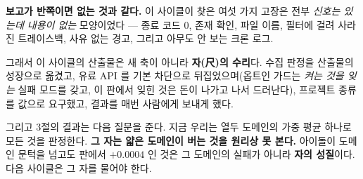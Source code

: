 \documentclass[10pt]{article}
\begin{document}
\textbf{보고가 반쪽이면 없는 것과 같다.} 이 사이클이 찾은 여섯 가지
고장은 전부 \emph{신호는 있는데 내용이 없는} 모양이었다 --- 종료 코드
0, 존재 확인, 파일 이름, 필터에 걸려 사라진 트레이스백, 사유 없는
경고, 그리고 아무도 안 보는 크론 로그.

그래서 이 사이클의 산출물은 새 축이 아니라 \textbf{자(尺)의 수리}다.
수집 판정을 산출물의 성장으로 옮겼고, 유료 API 를 기본 차단으로
뒤집었으며(옵트인 가드는 \emph{켜는 것을 잊는} 실패 모드를 갖고, 이
판에서 잊힌 것은 돈이 나가고 나서 드러난다), 프로젝트 종류를 값으로
요구했고, 결과를 매번 사람에게 보내게 했다.

그리고 3절의 결과는 다음 질문을 준다. 지금 우리는 열두 도메인의
가중 평균 하나로 모든 것을 판정한다. \textbf{그 자는 얇은 도메인이
버는 것을 원리상 못 본다.} 아이돌이 도메인 문턱을 넘고도 판에서
$+0.0004$ 인 것은 그 도메인의 실패가 아니라 \textbf{자의 성질}이다.
다음 사이클은 그 자를 물어야 한다.
\end{document}
